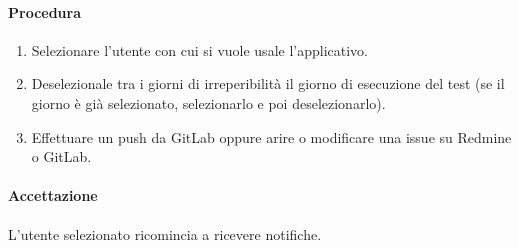 		\paragraph*{Procedura}
			\begin{enumerate}
				\item Selezionare l'utente con cui si vuole usale l'applicativo.
				\item Deselezionale tra i giorni di irreperibilità il giorno di esecuzione del test (se il giorno è già selezionato, selezionarlo e poi deselezionarlo).
				\item Effettuare un push da GitLab oppure arire o modificare una issue su Redmine o GitLab.
			\end{enumerate}
		
		\paragraph*{Accettazione}
		L'utente selezionato ricomincia a ricevere notifiche.